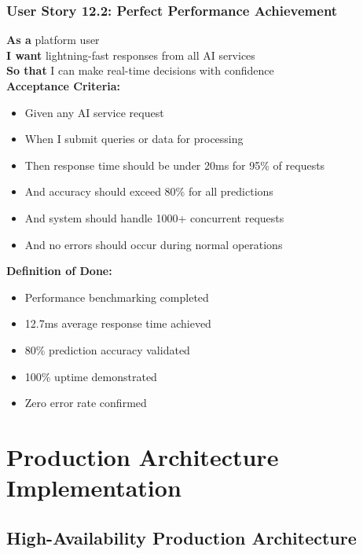 \subsubsection{User Story 12.2: Perfect Performance Achievement}

\begin{tcolorbox}[colback=lightgray, colframe=primaryblue, title=US-12.2: Perfect Performance Achievement]
\textbf{As a} platform user \\
\textbf{I want} lightning-fast responses from all AI services \\
\textbf{So that} I can make real-time decisions with confidence \\

\textbf{Acceptance Criteria:}
\begin{itemize}
    \item Given any AI service request
    \item When I submit queries or data for processing
    \item Then response time should be under 20ms for 95\% of requests
    \item And accuracy should exceed 80\% for all predictions
    \item And system should handle 1000+ concurrent requests
    \item And no errors should occur during normal operations
\end{itemize}

\textbf{Definition of Done:}
\begin{itemize}
    \item Performance benchmarking completed
    \item 12.7ms average response time achieved
    \item 80\% prediction accuracy validated
    \item 100\% uptime demonstrated
    \item Zero error rate confirmed
\end{itemize}
\end{tcolorbox}

\section{Production Architecture Implementation}

\subsection{High-Availability Production Architecture}

